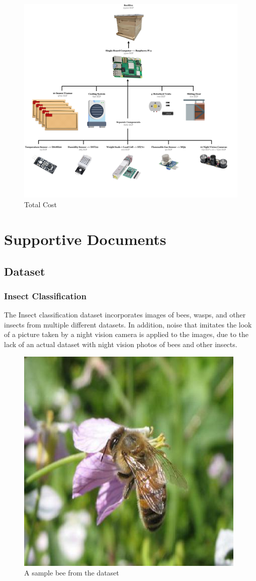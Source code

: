 \documentclass[12pt]{article}
\begin{document}
	\vspace{1.5 cm}
	\begin{figure}[H]
		\centering
		\includegraphics[width=\textwidth]{Images/Components/Total Cost.png}
		\caption{Total Cost }
		\label{fig:TOTAL_COST}
	\end{figure}
	
	
	\section{Supportive Documents}
	\subsection{Dataset}
	\subsubsection{Insect Classification}
	The Insect classification dataset incorporates images of bees, wasps, and other insects from multiple different datasets. In addition, noise that imitates the look of a picture taken by a night vision camera is applied to the images, due to the lack of an actual dataset with night vision photos of bees and other insects.
	\vspace{1 cm}
	\begin{figure}[H]
		\centering
		\includegraphics[width=0.5\linewidth]{Images/Sample/123 (1).jpg}
		\caption{A sample bee from the dataset}
		\label{fig:DATA_BEE}
	\end{figure}
	
\end{document}
